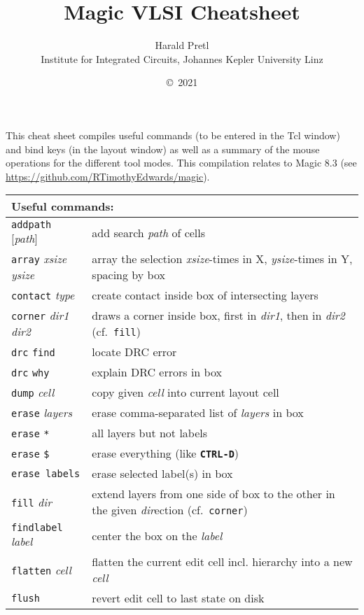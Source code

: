 \documentclass[10pt,a4paper]{article}
\author{Harald Pretl\\Institute for Integrated Circuits, Johannes Kepler University Linz}
\title{Magic VLSI Cheatsheet}
\date{\copyright~2021}
\newcommand{\key}[1]{\texttt{\textbf{#1}}}
\newcommand{\mac}[1]{\texttt{#1}}
\newcommand{\argu}[1]{\textit{#1}}
\begin{document}
	\maketitle
	
	This cheat sheet compiles useful commands (to be entered in the Tcl window) and bind keys (in the layout window) as well as a summary of the mouse operations for the different tool modes. This compilation relates to Magic 8.3 (see \url{https://github.com/RTimothyEdwards/magic}).
	
	\newpage

	\begin{tabular}{p{}p{}}
		\toprule
		\multicolumn{2}{l}{Useful commands:}\\
		\midrule
		\mac{addpath} [\argu{path}] & add search \argu{path} of cells\\
		\mac{array} \argu{xsize} \argu{ysize} & array the selection \argu{xsize}-times in X, \argu{ysize}-times in Y, spacing by box\\
		\mac{contact} \argu{type} & create contact inside box of intersecting layers\\
		\mac{corner} \argu{dir1} \argu{dir2} & draws a corner inside box, first in \argu{dir1}, then in \argu{dir2} (cf.~\mac{fill})\\
		\mac{drc} \mac{find} & locate DRC error\\
		\mac{drc} \mac{why} & explain DRC errors in box\\
		\mac{dump} \argu{cell} & copy given \argu{cell} into current layout cell\\
		\mac{erase} \argu{layers} & erase comma-separated list of \argu{layers} in box\\
		\mac{erase} \mac{*} & all layers but not labels\\
		\mac{erase} \mac{\$} & erase everything (like \key{CTRL-D})\\
		\mac{erase labels} & erase selected label(s) in box\\
		\mac{fill} \argu{dir} & extend layers from one side of box to the other in the given \argu{dir}ection (cf.~\mac{corner})\\
		\mac{findlabel} \argu{label} & center the box on the \argu{label}\\
		\mac{flatten} \argu{cell} & flatten the current edit cell incl. hierarchy into a new \argu{cell}\\
		\mac{flush} & revert edit cell to last state on disk\\

\end{tabular}
\end{document}
